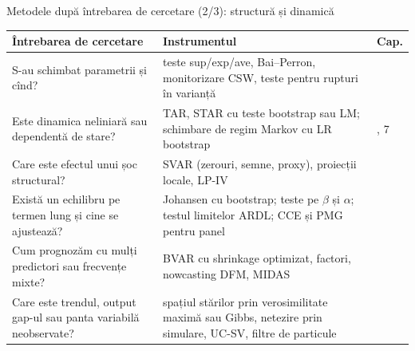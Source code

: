 \begin{frame}{Metodele după întrebarea de cercetare (2/3): structură și dinamică}
\itemsize{\small}
\begin{center}
\footnotesize
\begin{tabular}{>{\raggedright\arraybackslash}p{4.9cm}>{\raggedright\arraybackslash}p{5.6cm}>{\raggedright\arraybackslash}p{0.8cm}}
\toprule
\textbf{Întrebarea de cercetare} & \textbf{Instrumentul} & \textbf{Cap.} \\
\midrule
S-au schimbat parametrii și cînd? & teste sup/exp/ave, Bai--Perron, monitorizare CSW, teste pentru rupturi în varianță & 2 \\
Este dinamica neliniară sau dependentă de stare? & TAR, STAR cu teste bootstrap sau LM; schimbare de regim Markov cu LR bootstrap & 2, 7 \\
Care este efectul unui șoc structural? & SVAR (zerouri, semne, proxy), proiecții locale, LP-IV & 3 \\
Există un echilibru pe termen lung și cine se ajustează? & Johansen cu bootstrap; teste pe $\beta$ și $\alpha$; testul limitelor ARDL; CCE și PMG pentru panel & 4 \\
Cum prognozăm cu mulți predictori sau frecvențe mixte? & BVAR cu shrinkage optimizat, factori, nowcasting DFM, MIDAS & 5 \\
Care este trendul, output gap-ul sau panta variabilă neobservate? & spațiul stărilor prin verosimilitate maximă sau Gibbs, netezire prin simulare, UC-SV, filtre de particule & 6 \\
\bottomrule
\end{tabular}
\end{center}
\end{frame}

